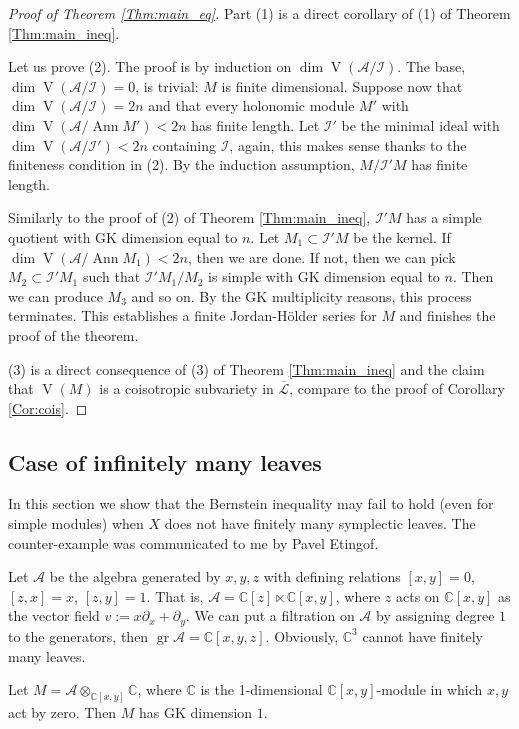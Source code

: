 \documentclass[12pt]{amsart}
\newcommand{\A}{\mathcal{A}}
\newcommand{\I}{\mathcal{I}}
\newcommand{\VA}{\operatorname{V}}
\newcommand{\gr}{\operatorname{gr}}
\newcommand{\C}{\mathbb{C}}
\theoremstyle{definition}
\begin{document}
\begin{proof}[Proof of Theorem \ref{Thm:main_eq}]
Part (1) is a direct corollary of (1) of Theorem \ref{Thm:main_ineq}.

Let us prove (2). The proof is by induction on $\dim \VA(\A/\I)$. The base, $\dim \VA(\A/\I)=0$,
is trivial: $M$ is finite dimensional. Suppose now that $\dim \VA(\A/\I)=2n$
and that every holonomic module  $M'$ with $\dim \VA(\A/\operatorname{Ann}M')<2n$ has finite length.
Let $\I'$ be the minimal ideal with $\dim \VA(\A/\I')<2n$ containing $\I$, again, this makes sense
thanks to the finiteness condition in (2). By the induction assumption, $M/\I' M$ has finite length.

Similarly to the proof of (2) of Theorem \ref{Thm:main_ineq}, $\I' M$ has a simple
quotient with GK dimension equal to $n$. Let $M_1\subset \I' M$ be the kernel.
If $\dim \VA(\A/\operatorname{Ann}M_1)<2n$, then we are done. If not, then we
can pick $M_2\subset \I' M_1$ such that $\I'M_1/M_2$ is simple with GK dimension equal
to $n$. Then we can produce $M_3$ and so on. By the GK multiplicity reasons, this process terminates.
This establishes a finite Jordan-H\"{o}lder series for $M$ and finishes the proof of the theorem.

(3) is a direct consequence of (3) of Theorem \ref{Thm:main_ineq} and the claim that $\VA(M)$
is a coisotropic subvariety in $\overline{\mathcal{L}}$, compare to the proof of
Corollary \ref{Cor:cois}.
\end{proof}

\subsection{Case of infinitely many leaves}\label{S_inf_leaf}
In this section we show that the Bernstein inequality may fail to hold (even for simple modules) when $X$
 does not have finitely many symplectic leaves. The counter-example was communicated to me by Pavel Etingof.

Let $\A$ be the algebra generated by $x,y,z$ with defining relations $[x,y]=0$, $[z,x]=x$, $[z,y]=1$.
 That is, $\A=\C[z]\ltimes \C[x,y]$, where $z$ acts on $\C[x,y]$ as the vector field
$v:=x\partial_x+\partial_y$. We can put a filtration on $\A$ by assigning degree $1$ to the generators, then $\gr \A=\C[x,y,z]$. Obviously, $\C^3$ cannot have finitely many leaves.

Let $M=\A\otimes _{\C[x,y]}\C$, where $\C$ is the 1-dimensional $\C[x,y]$-module in which
 $x,y$ act by zero. Then $M$ has GK dimension $1$.
\end{document}
